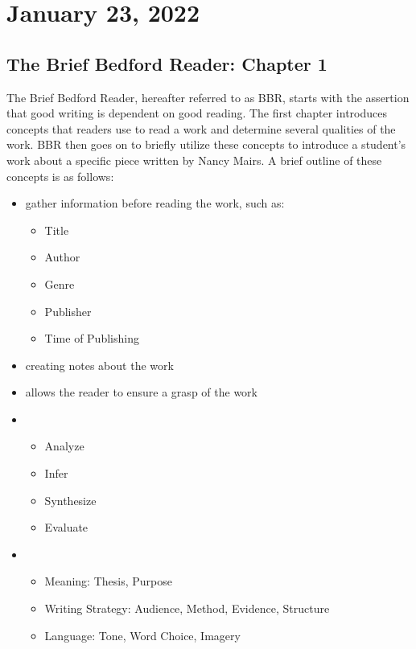\documentclass[journal.tex]{subfiles}
\begin{document}
\pagebreak
\section*{January 23, 2022}

\subsection*{The Brief Bedford Reader: Chapter 1}

The Brief Bedford Reader, hereafter referred to as BBR, starts with the assertion that good writing is dependent on good reading.
The first chapter introduces concepts that readers use to read a work and determine several qualities of the work.
BBR then goes on to briefly utilize these concepts to introduce a student's work about a specific piece written by Nancy Mairs.
A brief outline of these concepts is as follows:

\begin{itemize}
    \item {} gather information before reading the work, such as:
    \begin{itemize}
        \item Title
        \item Author
        \item Genre
        \item Publisher
        \item Time of Publishing
    \end{itemize}

    \item {} creating notes about the work
    \item {} allows the reader to ensure a grasp of the work
    
    \item {}
    \begin{itemize}
        \item Analyze
        \item Infer
        \item Synthesize
        \item Evaluate
    \end{itemize}
    
    \item {}
    \begin{itemize}
        \item Meaning: Thesis, Purpose
        \item Writing Strategy: Audience, Method, Evidence, Structure
        \item Language: Tone, Word Choice, Imagery
    \end{itemize}
\end{itemize}
\end{document}

